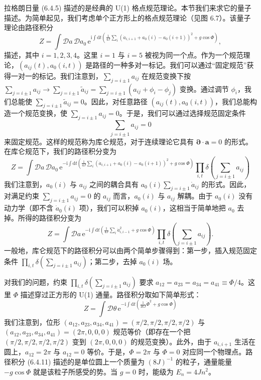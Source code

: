 拉格朗日量 (6.4.5) 描述的是经典的 U(1) 格点规范理论。本节我们来求它的量子描述。为简单起见，我们考虑单个正方形上的格点规范理论（见图 6.7）。该量子理论由路径积分
\begin{equation*}
Z=\int\mathcal{D}a\,\mathcal{D}a_{0}\,\mathrm{e}^{\mathrm{i}\int\mathrm{d}t\left(\frac{1}{4J}\sum_{i}(\dot{a}_{i,i+1}+a_{0}(i)-a_{0}(i+1))^{2}+g\cos\Phi\right)}, \tag{6.4.10}
\end{equation*}
描述，其中 $i=1,2,3,4$。这里 $i=1$ 与 $i=5$ 被视为同一个点。作为一个规范理论，$(a_{ij}(t),a_{0}(i,t))$ 是路径的一种多对一标记。我们可以通过“固定规范”获得一对一的标记。我们注意到，$\sum_{j=i\pm1}a_{ij}$ 在规范变换下按
$\sum_{j=i\pm1}a_{ij}\rightarrow\sum_{j=i\pm1}\tilde{a}_{ij}=\sum_{j=i\pm1}(a_{ij}+\phi_{i}-\phi_{j})$
变换。通过调节 $\phi_{i}$，我们总能使 $\sum_{j=i\pm1}\tilde{a}_{ij}=0$。因此，对任意路径 $(a_{ij}(t),a_{0}(i,t))$，我们总能构造一个规范变换，使 $\sum_{j=i\pm1}a_{ij}=0$。于是，我们可以通过选择规范固定条件
\begin{equation*}
\sum_{j=i\pm1}a_{ij}=0
\end{equation*}
来固定规范。这样的规范称为库仑规范，对于连续理论它具有 $\pmb{\partial}\cdot\pmb{a}=0$ 的形式。在库仑规范下，我们的路径积分变为
\begin{equation*}
Z=\int\mathcal{D}a\,\mathcal{D}a_{0}\,\mathrm{e}^{-\mathrm{i}\int\mathrm{d}t\left(\frac{1}{4J}\sum_{i}(\dot{a}_{i,i+1}+a_{0}(i)-a_{0}(i+1))^{2}+g\cos\Phi\right)}\prod_{i,t}\delta\left(\sum_{j=i\pm1}a_{ij}\right)
\end{equation*}
我们注意到，$a_{0}(i)$ 与 $a_{ij}$ 之间的耦合具有 $a_{0}(i)\sum_{j=i\pm1}\dot{a}_{ij}$ 的形式。因此，对满足约束 $\sum_{j=i\pm1}a_{ij}=0$ 的 $a_{ij}$ 而言，$a_{0}(i)$ 与 $a_{ij}$ 解耦。由于 $a_{0}(i)$ 没有动力学（即不含 $\dot{a}_{0}(i)$ 项），我们可以积掉 $a_{0}(i)$，这相当于简单地把 $a_{0}$ 去掉。所得的路径积分变为
\begin{equation*}
Z=\int\mathcal{D}a\,\mathrm{e}^{-\mathrm{i}\int\mathrm{d}t\left(\frac{1}{4J}\sum_{i}\dot{a}_{i,i-1}^{2}+g\cos\Phi\right)}\prod_{i,t}\delta\left(\sum_{j=i\pm1}a_{ij}\right).
\end{equation*}
一般地，库仑规范下的路径积分可以由两个简单步骤得到：第一步，插入规范固定条件 $\prod_{i,t}\allowbreak\delta(\sum_{j=i\pm1}\allowbreak a_{ij})$；第二步，去掉 $a_{0}(i)$ 场。

对我们的问题，约束 $\prod_{i,t}\delta(\sum_{j=i\pm1}a_{ij})$ 要求 $a_{12}=a_{23}=a_{34}=a_{41}\equiv\Phi/4$。这里 $\Phi$ 描述穿过正方形的 U(1) 通量。路径积分取如下简单形式：
\begin{equation*}
Z=\int\mathcal{D}\theta\,\mathrm{e}^{-\mathrm{i}\int\mathrm{d}t\left(\frac{1}{16J}\dot{\Phi}^{2}+g\cos\Phi\right)} \tag{6.4.11}
\end{equation*}
我们注意到，位形 $(a_{12},a_{23},a_{34},a_{41})=(\pi/2,\pi/2,\pi/2,\pi/2)$ 与 $(a_{12},a_{23},a_{34},a_{41})=(2\pi,0,0,0)$ 规范等价（即存在一个把 $(\pi/2,\pi/2,\pi/2,\pi/2)$ 变到 $(2\pi,0,0,0)$ 的规范变换）。此外，由于 $a_{i,i+1}$ 生活在圆上，$a_{12}=2\pi$ 与 $a_{12}=0$ 等价。于是，$\Phi=2\pi$ 与 $\Phi=0$ 对应同一个物理点。路径积分 (6.4.11) 描述的是单位圆上一个质量为 $(8J)^{-1}$ 的粒子，通量能量 $-g\cos\Phi$ 就是该粒子所感受的势。当 $g=0$ 时，能级为 $E_{n}=4Jn^{2}$。

